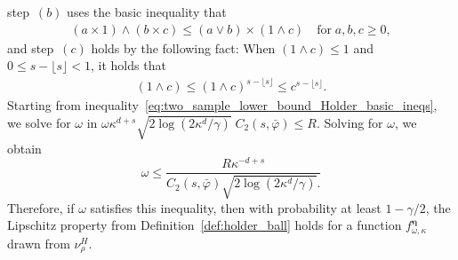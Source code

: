 \documentclass[twoside,11pt]{article}
\newcommand{\floor}[1]{\lfloor #1 \rfloor} %
\newcommand{\dimDensity}{d} %
\newcommand{\smoothness}{s}
\newcommand{\ballRadius}{R}
\newcommand{\binNum}{\kappa}           %
\begin{document}
\begin{appendix}
	step~$(b)$ uses the basic inequality that
	\begin{align*}
		(a \times 1) \wedge (b \times c) \leq (a \vee b) \times (1 \wedge c)
		\quad \text{for} \; a,b,c \geq 0,
	\end{align*}
	and
	step~$(c)$ holds by the following fact:
	When $(1 \wedge c) \leq 1$
	and
	$0 \leq s- \floor{s} < 1$,
	it holds that
	\begin{align*}
		(1 \wedge c) \leq (1 \wedge c)^{s - \floor{s}} \leq c^{s - \floor{s}}.
	\end{align*}
	Starting from inequality~\eqref{eq:two_sample_lower_bound_Holder_basic_ineqs}, we solve for \(\omega\) in
	$
	\omega
	\kappa^{\dimDensity + s}
	\sqrt{2 \log(2{\binNum^{\dimDensity}}/\gamma)}
	\; C_2(s, \bar{\varphi}) \leq \ballRadius
	$.
	Solving for \(\omega\), we obtain
	\begin{equation}\label{condition_holder_lipschitz}
		\omega
		\leq
		\frac{\ballRadius \binNum^{-\dimDensity + \smoothness}}{
			C_2(s, \bar{\varphi})  \sqrt{2 \log(2{\binNum^{\dimDensity}}/\gamma)}.
		}
	\end{equation}
	Therefore, if \(\omega\) satisfies this inequality, then with probability at least \(1 - \gamma/2\), the Lipschitz property from Definition~\ref{def:holder_ball} holds for a function \(f^{{\boldsymbol{\eta}}}_{\omega, \binNum}\) drawn from \(\nu_\rho^H\).
	\noindent

\end{appendix}
\end{document}
